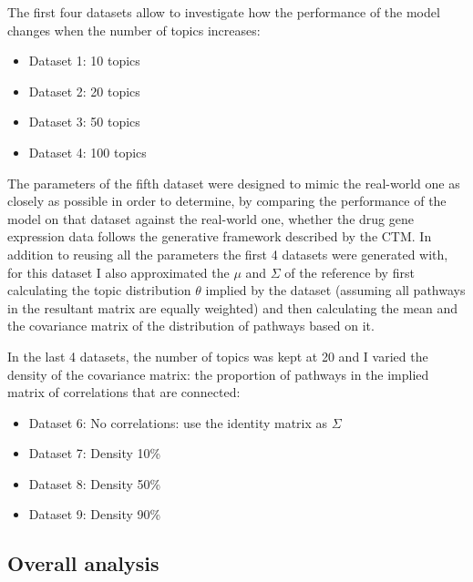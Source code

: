 \documentclass[12pt,a4paper,twoside,openright]{report}
\begin{document}
The first four datasets allow to investigate how the performance of the model changes when the number of topics increases:

\begin{itemize}[noitemsep]
\item Dataset 1: 10 topics
\item Dataset 2: 20 topics
\item Dataset 3: 50 topics
\item Dataset 4: 100 topics
\end{itemize}

The parameters of the fifth dataset were designed to mimic the real-world one as closely as possible in order to determine, by comparing the performance of the model on that dataset against the real-world one, whether the drug gene expression data follows the generative framework described by the CTM. In addition to reusing all the parameters the first 4 datasets were generated with, for this dataset I also approximated the $\mu$ and $\Sigma$ of the reference by first calculating the topic distribution $\theta$ implied by the dataset (assuming all pathways in the resultant matrix are equally weighted) and then calculating the mean and the covariance matrix of the distribution of pathways based on it.

In the last 4 datasets, the number of topics was kept at 20 and I varied the density of the covariance matrix: the proportion of pathways in the implied matrix of correlations that are connected:

\begin{itemize}[noitemsep]
\item Dataset 6: No correlations: use the identity matrix as $\Sigma$
\item Dataset 7: Density 10\%
\item Dataset 8: Density 50\%
\item Dataset 9: Density 90\%
\end{itemize}

\subsection{Overall analysis}
\end{document}
